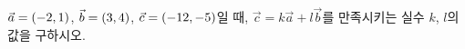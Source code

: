 $\vec{a}=(-2{,}\mkern3mu\mathopen{}1)$, $\vec{b}=(3{,}\mkern3mu\mathopen{}4)$, $\vec{c}=(-12{,}\mkern3mu\mathopen{}-5)$일 때, $\vec{c}=k\vec{a}+l\vec{b}$를 만족시키는 실수 $k$, $l$의 값을 구하시오.
